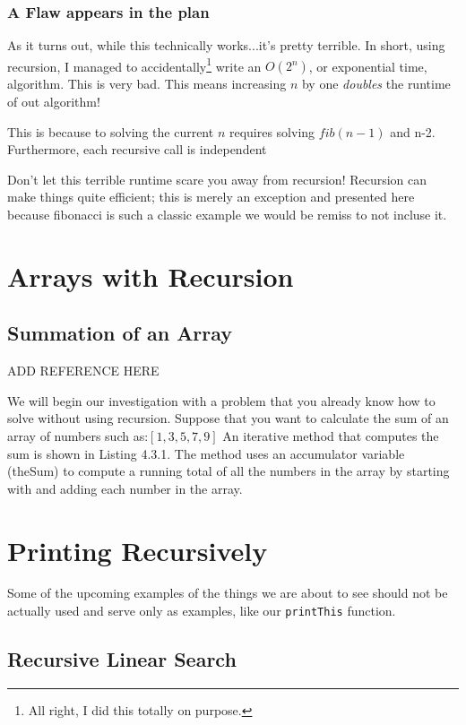 \subsubsection{A Flaw appears in the plan}
As it turns out, while this technically works...it's pretty terrible.  In short, using recursion, I managed to accidentally\footnote{All right, I did this totally on purpose.} write an $ O(2^n) $, or exponential time,  algorithm.  This is very bad.  This means increasing $ n $ by one \emph{doubles} the runtime of out algorithm!

This is because to solving the current $n$ requires solving $fib(n-1)$ and n-2.  Furthermore, each recursive call is independent



Don't let this terrible runtime scare you away from recursion!  Recursion can make things quite efficient; this is merely an exception and presented here because fibonacci is such a classic example we would be remiss to not incluse it.


\section{Arrays with Recursion}


\subsection{Summation of an Array}
ADD REFERENCE HERE


We will begin our investigation with a problem that you already know how to solve without using recursion. Suppose that you want to calculate the sum of an array of numbers such as:$[1, 3, 5, 7, 9]$ An iterative method that computes the sum is shown in Listing 4.3.1. The method uses an accumulator variable (theSum) to compute a running total of all the numbers in the array by starting with and adding each number in the array.

\section{Printing Recursively}
Some of the upcoming examples  of the things we are about to see should not be actually  used and serve only as examples, like our \texttt{printThis} function.



\subsection{Recursive Linear Search}




